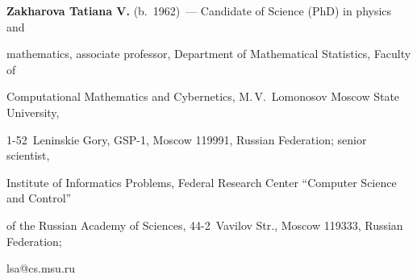\vspace*{3pt}





\noindent


\textbf{Zakharova Tatiana V.} (b.\ 1962)~--- Candidate of Science (PhD) in physics and 


mathematics, associate professor, Department of Mathematical Statistics, Faculty of 


Computational Mathematics and Cybernetics, M.\,V.~Lomonosov Moscow State University, 


1-52~Leninskie Gory, GSP-1, Moscow 119991, Russian Federation; senior scientist, 


Institute of Informatics Problems, Federal Research Center ``Computer Science and Control'' 


of the Russian Academy of Sciences, 44-2~Vavilov Str., Moscow 119333, Russian Federation; 


\mbox{lsa@cs.msu.ru}


\label{end\stat}





\renewcommand{\bibname}{\protect\rm Литература} 


